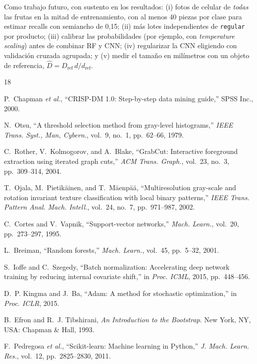 \documentclass[conference]{IEEEtran}
\newcommand{\cls}[1]{\texttt{#1}}
\begin{document}
Como trabajo futuro, con sustento en los resultados: (i) fotos de celular de \emph{todas} las frutas en la mitad de entrenamiento, con al menos 40 piezas por clase para estimar recalls con semiancho de 0,15; (ii) más lotes independientes de \cls{regular} por producto; (iii) calibrar las probabilidades (por ejemplo, con \emph{temperature scaling}) antes de combinar RF y CNN; (iv) regularizar la CNN eligiendo con validación cruzada agrupada; y (v) medir el tamaño en milímetros con un objeto de referencia, $\hat D=D_{\text{ref}}\,d/d_{\text{ref}}$.

\begin{thebibliography}{18}

P.~Chapman \emph{et al.}, ``CRISP-DM 1.0: Step-by-step data mining guide,'' SPSS Inc., 2000.

N.~Otsu, ``A threshold selection method from gray-level histograms,'' \emph{IEEE Trans. Syst., Man, Cybern.}, vol.~9, no.~1, pp.~62--66, 1979.

C.~Rother, V.~Kolmogorov, and A.~Blake, ``GrabCut: Interactive foreground extraction using iterated graph cuts,'' \emph{ACM Trans. Graph.}, vol.~23, no.~3, pp.~309--314, 2004.

T.~Ojala, M.~Pietikäinen, and T.~Mäenpää, ``Multiresolution gray-scale and rotation invariant texture classification with local binary patterns,'' \emph{IEEE Trans. Pattern Anal. Mach. Intell.}, vol.~24, no.~7, pp.~971--987, 2002.

C.~Cortes and V.~Vapnik, ``Support-vector networks,'' \emph{Mach. Learn.}, vol.~20, pp.~273--297, 1995.

L.~Breiman, ``Random forests,'' \emph{Mach. Learn.}, vol.~45, pp.~5--32, 2001.

S.~Ioffe and C.~Szegedy, ``Batch normalization: Accelerating deep network training by reducing internal covariate shift,'' in \emph{Proc. ICML}, 2015, pp.~448--456.

D.~P. Kingma and J.~Ba, ``Adam: A method for stochastic optimization,'' in \emph{Proc. ICLR}, 2015.

B.~Efron and R.~J. Tibshirani, \emph{An Introduction to the Bootstrap}. New York, NY, USA: Chapman \& Hall, 1993.

F.~Pedregosa \emph{et al.}, ``Scikit-learn: Machine learning in Python,'' \emph{J. Mach. Learn. Res.}, vol.~12, pp.~2825--2830, 2011.


\end{thebibliography}
\end{document}
